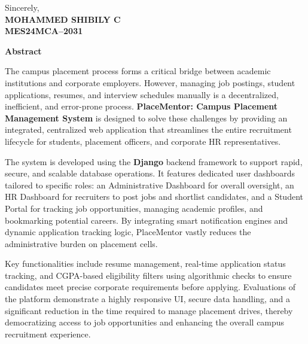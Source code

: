 \documentclass[a4paper,12pt]{report}
\begin{document}
\vspace{3cm} 

\begin{flushright}
Sincerely,\\
\textbf{MOHAMMED SHIBILY C}\\
\textbf{MES24MCA--2031}
\end{flushright}


\newpage
\begin{center}
\Large\textbf{Abstract}
\end{center}
\vspace{1cm}

The campus placement process forms a critical bridge between academic institutions and corporate employers. However, managing job postings, student applications, resumes, and interview schedules manually is a decentralized, inefficient, and error-prone process. \textbf{PlaceMentor: Campus Placement Management System} is designed to solve these challenges by providing an integrated, centralized web application that streamlines the entire recruitment lifecycle for students, placement officers, and corporate HR representatives.

The system is developed using the \textbf{Django} backend framework to support rapid, secure, and scalable database operations. It features dedicated user dashboards tailored to specific roles: an Administrative Dashboard for overall oversight, an HR Dashboard for recruiters to post jobs and shortlist candidates, and a Student Portal for tracking job opportunities, managing academic profiles, and bookmarking potential careers. By integrating smart notification engines and dynamic application tracking logic, PlaceMentor vastly reduces the administrative burden on placement cells.

Key functionalities include resume management, real-time application status tracking, and CGPA-based eligibility filters using algorithmic checks to ensure candidates meet precise corporate requirements before applying. Evaluations of the platform demonstrate a highly responsive UI, secure data handling, and a significant reduction in the time required to manage placement drives, thereby democratizing access to job opportunities and enhancing the overall campus recruitment experience.

\newpage

\tableofcontents
\newpage
\listoffigures
\newpage
\listoftables
\end{document}
